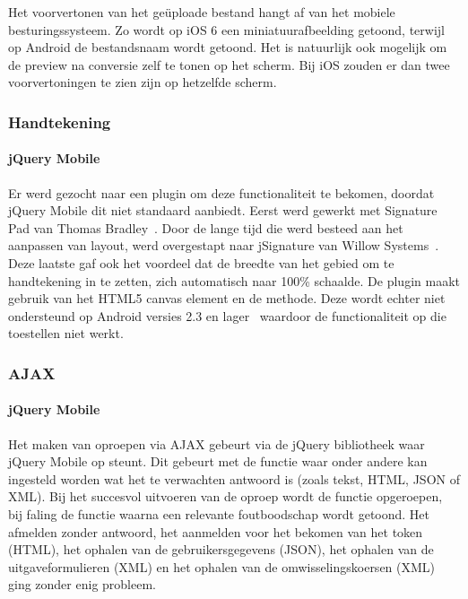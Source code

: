 Het voorvertonen van het geüploade bestand hangt af van het mobiele besturingssysteem.
Zo wordt op iOS 6 een miniatuurafbeelding getoond, terwijl op Android de bestandsnaam wordt getoond.
Het is natuurlijk ook mogelijk om de preview na conversie zelf te tonen op het scherm.
Bij iOS zouden er dan twee voorvertoningen te zien zijn op hetzelfde scherm.

\subsubsection{Handtekening}

\paragraph{jQuery Mobile} 
Er werd gezocht naar een plugin om deze functionaliteit te bekomen, doordat jQuery Mobile dit niet standaard aanbiedt. 
Eerst werd gewerkt met Signature Pad van Thomas Bradley~\cite{Bradley2013}. 
Door de lange tijd die werd besteed aan het aanpassen van layout, werd overgestapt naar jSignature van Willow Systems~\cite{Systems2013}. 
Deze laatste gaf ook het voordeel dat de breedte van het gebied om te handtekening in te zetten, zich automatisch naar 100\% schaalde. 
De plugin maakt gebruik van het HTML5 canvas element en de  methode.
Deze wordt echter niet ondersteund op Android versies 2.3 en lager~\cite{Systems2013} waardoor de functionaliteit op die toestellen niet werkt.

\subsubsection{AJAX}

\paragraph{jQuery Mobile} 
Het maken van oproepen via AJAX gebeurt via de jQuery bibliotheek waar jQuery Mobile op steunt. 
Dit gebeurt met de functie  waar onder andere kan ingesteld worden wat het te verwachten antwoord is (zoals tekst, HTML, JSON of XML). 
Bij het succesvol uitvoeren van de oproep wordt de  functie opgeroepen, bij faling de  functie waarna een relevante foutboodschap wordt getoond.
Het afmelden zonder antwoord, het aanmelden voor het bekomen van het token (HTML), het ophalen van de gebruikersgegevens (JSON), het ophalen van de uitgaveformulieren (XML) en het ophalen van de omwisselingskoersen (XML) ging zonder enig probleem.

